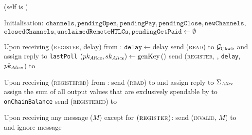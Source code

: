 \ \\  (self is \alice)
  \label{alg:lightningprot}
  \begin{algorithmic}[1]
    \State Initialisation:
    \Indent
      \State $\mathtt{channels}, \mathtt{pendingOpen}, \mathtt{pendingPay},
      \mathtt{pendingClose}, \mathtt{newChannels},$ $\mathtt{closedChannels},
      \mathtt{unclaimedRemoteHTLCs}, \mathtt{pendingGetPaid} \gets \emptyset$
    \EndIndent
    \State

    \State Upon receiving (\textsc{register}, delay) from \environment:
    \Indent
      \State $\mathtt{delay} \gets \mathrm{delay}$
      \State send (\textsc{read}) to $\mathcal{G}_{\mathrm{Clock}}$ and assign reply to
      \texttt{lastPoll}
      \State $\left(pk_{\mathit{Alice}}, sk_{\mathit{Alice}}\right) \gets
      \mathrm{genKey}\left(\right)$
      \State send (\textsc{register}, \alice, \texttt{delay},
      $pk_{\mathit{Alice}}$) to \adversary {}
    \EndIndent
    \State

    \State Upon receiving (\textsc{registered}) from \adversary:
    \Indent
      \State send (\textsc{read}) to \ledger{} and assign reply to
      $\Sigma_{\mathit{Alice}}$
      \State assign the sum of all output values that are exclusively spendable
      by \alice{} to \texttt{onChainBalance}
      \State send (\textsc{registered}) to \environment
    \EndIndent
    \State

    \State Upon receiving any message ($M$) except for
    $\left(\textsc{register}\right)$:
    \Indent
        \State send (\textsc{invalid}, $M$) to \adversary{} and ignore message
      \EndIf
    \EndIndent
    \State


\end{algorithmic}
